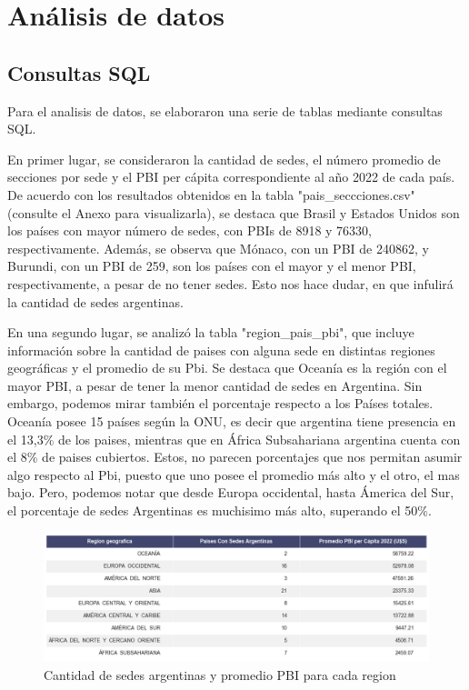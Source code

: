 \documentclass[10pt,a4paper]{article}
\begin{document}
\newpage

\section{Análisis de datos}

\subsection{Consultas SQL}

Para el analisis de datos, se elaboraron una serie de tablas mediante consultas SQL.

En primer lugar, se consideraron la cantidad de sedes, el número promedio de secciones por sede y el PBI per cápita correspondiente al año 2022 de cada país.
De acuerdo con los resultados obtenidos en la tabla "pais\_seccciones.csv" (consulte el Anexo para visualizarla), se destaca que Brasil y Estados Unidos son los países con mayor número de sedes, con PBIs de 8918 y 76330, respectivamente. Además, se observa que Mónaco, con un PBI de 240862, y Burundi, con un PBI de 259, son los países con el mayor y el menor PBI, respectivamente, a pesar de no tener sedes. Esto nos hace dudar, en que infulirá la cantidad de sedes argentinas.

\vspace{0.1cm}

En una segundo lugar, se analizó la tabla "region\_pais\_pbi", que incluye información sobre la cantidad de paises con alguna sede en distintas regiones geográficas y el promedio de su Pbi. Se destaca que Oceanía es la región con el mayor PBI, a pesar de tener la menor cantidad de sedes en Argentina. Sin embargo, podemos mirar también el porcentaje respecto a los Países totales. Oceanía posee 15 países según la ONU, es decir que argentina tiene presencia en el 13,3\% de los paises, mientras que en África Subsahariana argentina cuenta con el 8\% de paises cubiertos. Estos, no parecen porcentajes que nos permitan asumir algo respecto al Pbi, puesto que uno posee el promedio más alto y el otro, el mas bajo. Pero, podemos notar que desde Europa occidental, hasta Ámerica del Sur, el porcentaje de sedes Argentinas es muchisimo más alto, superando el 50\%.

\vspace{12pt}

\begin{figure}[h]
  \centering
  \includegraphics[width=1.0\textwidth]{TABLARegion.png}
  \caption{ Cantidad de sedes argentinas y promedio PBI para  cada region}
  \label{fig:Tabla 1}
\end{figure}
\end{document}
